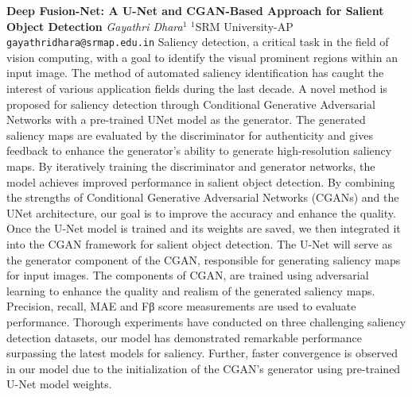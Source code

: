 
    \begin{conf-abstract}[]
        {\textbf{Deep Fusion-Net: A U-Net and CGAN-Based Approach for Salient Object Detection}}
        {\textit{Gayathri Dhara$^{1}$}}
        {$^{1}$SRM University-AP}
        {\texttt{gayathridhara@srmap.edu.in}}
        {Saliency detection, a critical task in the field of vision computing, with a goal to identify the visual prominent regions within an input image. The method of automated saliency identification has caught the interest of various application fields during the last decade.  A novel method is proposed for saliency detection through Conditional Generative Adversarial Networks with a pre-trained UNet model as the generator. The generated saliency maps are evaluated by the discriminator for authenticity and gives feedback to enhance the generator's ability to generate high-resolution saliency maps. By iteratively training the discriminator and generator networks, the model achieves improved performance in salient object detection. By combining the strengths of Conditional Generative Adversarial Networks (CGANs) and the UNet architecture, our goal is to improve the accuracy and enhance the quality. Once the U-Net model is trained and its weights are saved, we then integrated it into the CGAN framework for salient object detection. The U-Net will serve as the generator component of the CGAN, responsible for generating saliency maps for input images. The components of CGAN, are trained using adversarial learning to enhance the quality and realism of the generated saliency maps. Precision, recall, MAE and Fβ score measurements are used to evaluate performance. Thorough experiments have conducted on three challenging saliency detection datasets, our model has demonstrated remarkable performance surpassing the latest models for saliency. Further, faster convergence is observed in our model due to the initialization of the CGAN's generator using pre-trained U-Net model weights.}
    \end{conf-abstract}
        